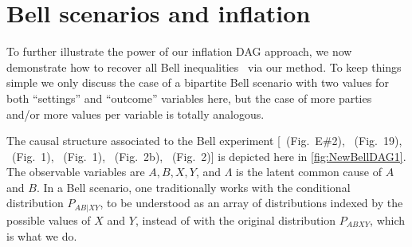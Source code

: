 
\section{Bell scenarios and inflation}
\label{sec:Bellscenarios}


To further illustrate the power of our inflation DAG approach, we now demonstrate how to recover all Bell inequalities~\cite{Brunner2013Bell,bell1966lhvm,CHSHOriginal} via our method. To keep things simple we only discuss the case of a bipartite Bell scenario with two values for both ``settings'' and ``outcome'' variables here, but the case of more parties and/or more values per variable is totally analogous.

The causal structure associated to the Bell \cite{bell1964einstein,Brunner2013Bell,bell1966lhvm,CHSHOriginal} experiment [\citealp{pusey2014gdag}~(Fig.~E\#2), \citealp{WoodSpekkens}~(Fig.~19), \citealp{chaves2014novel}~(Fig.~1), \citealp{BeyondBellII}~(Fig.~1), \citealp{wolfe2015nonconvexity}~(Fig.~2b), \citealp{steeg2011relaxation}~(Fig.~2)] is depicted here in \cref{fig:NewBellDAG1}. The observable variables are $A,B,X,Y$, and $\Lambda$ is the latent common cause of $A$ and $B$. In a Bell scenario, one traditionally works with the conditional distribution $P_{AB|XY}$, to be understood as an array of distributions indexed by the possible values of $X$ and $Y$, instead of with the original distribution $P_{ABXY}$, which is what we do.

